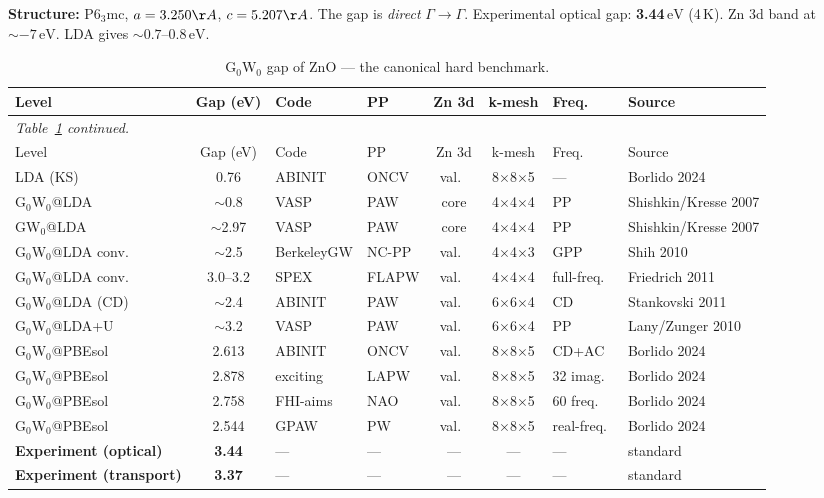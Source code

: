 \documentclass[11pt]{article}
\newcommand{\eV}{\ensuremath{\,\mathrm{eV}}}
\newcommand{\target}[1]{\textbf{\textcolor{blue!60!black}{#1}}}
\begin{document}
\textbf{Structure:} P6$_3$mc, $a = 3.250\AA$, $c = 5.207\AA$.
The gap is \emph{direct} $\Gamma \to \Gamma$. Experimental optical gap:
\target{3.44\eV} (4\,K). Zn 3d band at $\sim -7\eV$. LDA gives
$\sim 0.7$--$0.8\eV$.

\begin{longtable}{p{3.2cm} c l l c c l p{3.0cm}}
\caption{G$_0$W$_0$ gap of ZnO --- the canonical hard benchmark.}
\label{tab:zno_gw} \\
\toprule
Level & Gap (eV) & Code & PP & Zn 3d & k-mesh & Freq. & Source \\
\midrule
\endfirsthead
\multicolumn{8}{l}{\emph{Table~\ref{tab:zno_gw} continued.}} \\
\toprule
Level & Gap (eV) & Code & PP & Zn 3d & k-mesh & Freq. & Source \\
\midrule
\endhead
LDA (KS)              & 0.76     & ABINIT    & ONCV  & val.\ & 8$\times$8$\times$5 & ---       & Borlido 2024 \\
G$_0$W$_0$@LDA        & $\sim$0.8 & VASP     & PAW   & core  & 4$\times$4$\times$4 & PP & Shishkin/Kresse 2007 \\
GW$_0$@LDA            & $\sim$2.97 & VASP    & PAW   & core  & 4$\times$4$\times$4 & PP & Shishkin/Kresse 2007 \\
G$_0$W$_0$@LDA conv.\ & $\sim$2.5 & BerkeleyGW & NC-PP & val.\ & 4$\times$4$\times$3 & GPP & Shih 2010 \\
G$_0$W$_0$@LDA conv.\ & 3.0--3.2 & SPEX     & FLAPW & val.\ & 4$\times$4$\times$4 & full-freq.\ & Friedrich 2011 \\
G$_0$W$_0$@LDA (CD)   & $\sim$2.4 & ABINIT   & PAW   & val.\ & 6$\times$6$\times$4 & CD & Stankovski 2011 \\
G$_0$W$_0$@LDA+U      & $\sim$3.2 & VASP     & PAW   & val.\ & 6$\times$6$\times$4 & PP & Lany/Zunger 2010 \\
G$_0$W$_0$@PBEsol     & 2.613    & ABINIT    & ONCV  & val.\ & 8$\times$8$\times$5 & CD+AC & Borlido 2024 \\
G$_0$W$_0$@PBEsol     & 2.878    & exciting  & LAPW  & val.\ & 8$\times$8$\times$5 & 32 imag. & Borlido 2024 \\
G$_0$W$_0$@PBEsol     & 2.758    & FHI-aims  & NAO   & val.\ & 8$\times$8$\times$5 & 60 freq. & Borlido 2024 \\
G$_0$W$_0$@PBEsol     & 2.544    & GPAW      & PW    & val.\ & 8$\times$8$\times$5 & real-freq.\ & Borlido 2024 \\
\target{Experiment (optical)} & \target{3.44} & --- & --- & --- & --- & --- & standard \\
\target{Experiment (transport)} & \target{3.37} & --- & --- & --- & --- & --- & standard \\
\bottomrule
\end{longtable}
\end{document}
